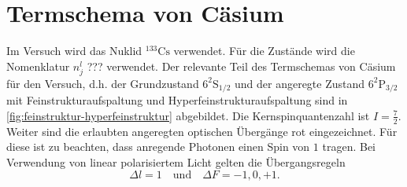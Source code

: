 \documentclass[../bericht.tex]{subfiles}
\begin{document}
    \section{Termschema von Cäsium}
    \label{sec:termschema-caesium}

      Im Versuch wird das Nuklid $\mathrm{^{133}Cs}$ verwendet. Für die Zustände wird die Nomenklatur $n^ l_j$ ??? verwendet. Der relevante Teil des Termschemas von Cäsium für den Versuch, d.h. der Grundzustand $\mathrm{6^2 S_{1/2}}$ und der angeregte Zustand $\mathrm{6^2P_{3/2}}$ mit Feinstrukturaufspaltung und Hyperfeinstrukturaufspaltung sind in \cref{fig:feinstruktur-hyperfeinstruktur} abgebildet. Die Kernspinquantenzahl ist $I=\frac{7}{2}$. Weiter sind die erlaubten angeregten optischen Übergänge rot eingezeichnet. Für diese ist zu beachten, dass anregende Photonen einen Spin von $1$ tragen. Bei Verwendung von linear polarisiertem Licht gelten die Übergangsregeln
      \begin{equation*}
        \Delta l = 1\quad \text{und}\quad \Delta F = -1,0,+1.
      \end{equation*}
\end{document}
